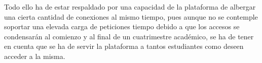 \documentclass[12pt]{article}
\begin{document}
Todo ello ha de estar respaldado por una capacidad de la plataforma de albergar una cierta cantidad de conexiones al mismo tiempo, pues aunque no se contemple soportar una elevada carga de peticiones tiempo debido a que los accesos se condensarán al comienzo y al final de un cuatrimestre académico, se ha de tener en cuenta que se ha de servir la plataforma a tantos estudiantes como deseen acceder a la misma.


\newpage

\printglossaries

\newpage

\begin{appendices}

\end{appendices}
\end{document}
